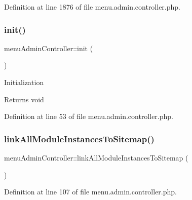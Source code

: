 Definition at line 1876 of file menu.\+admin.\+controller.\+php.

\hypertarget{classmenuAdminController_aa4ab2ac50988120d74af3f15a4beb144}{}\label{classmenuAdminController_aa4ab2ac50988120d74af3f15a4beb144} 
\subsubsection{\texorpdfstring{init()}{init()}}
{\footnotesize\ttfamily menu\+Admin\+Controller\+::init (\begin{DoxyParamCaption}{ }\end{DoxyParamCaption})}

Initialization \begin{DoxyReturn}{Returns}
void 
\end{DoxyReturn}


Definition at line 53 of file menu.\+admin.\+controller.\+php.

\hypertarget{classmenuAdminController_a49adc0f822800b87a3419fc4d0d48005}{}\label{classmenuAdminController_a49adc0f822800b87a3419fc4d0d48005} 
\subsubsection{\texorpdfstring{link\+All\+Module\+Instances\+To\+Sitemap()}{linkAllModuleInstancesToSitemap()}}
{\footnotesize\ttfamily menu\+Admin\+Controller\+::link\+All\+Module\+Instances\+To\+Sitemap (\begin{DoxyParamCaption}{ }\end{DoxyParamCaption})}



Definition at line 107 of file menu.\+admin.\+controller.\+php.

\hypertarget{classmenuAdminController_a14bb1d222613177761419783e99b9c30}{}\label{classmenuAdminController_a14bb1d222613177761419783e99b9c30} 
